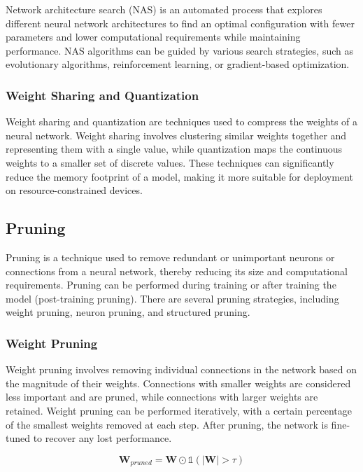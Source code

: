 \documentclass[12pt]{article}
\begin{document}
Network architecture search (NAS) is an automated process that explores different neural network architectures to find an optimal configuration with fewer parameters and lower computational requirements while maintaining performance. NAS algorithms can be guided by various search strategies, such as evolutionary algorithms, reinforcement learning, or gradient-based optimization.

\subsubsection{Weight Sharing and Quantization}

Weight sharing and quantization are techniques used to compress the weights of a neural network. Weight sharing involves clustering similar weights together and representing them with a single value, while quantization maps the continuous weights to a smaller set of discrete values. These techniques can significantly reduce the memory footprint of a model, making it more suitable for deployment on resource-constrained devices.

\subsection{Pruning}

Pruning is a technique used to remove redundant or unimportant neurons or connections from a neural network, thereby reducing its size and computational requirements. Pruning can be performed during training or after training the model (post-training pruning). There are several pruning strategies, including weight pruning, neuron pruning, and structured pruning.

\subsubsection{Weight Pruning}

Weight pruning involves removing individual connections in the network based on the magnitude of their weights. Connections with smaller weights are considered less important and are pruned, while connections with larger weights are retained. Weight pruning can be performed iteratively, with a certain percentage of the smallest weights removed at each step. After pruning, the network is fine-tuned to recover any lost performance.

\begin{equation}
\textbf{W}_{pruned} = \textbf{W} \odot \mathbb{1}(|\textbf{W}| > \tau)
\end{equation}
\end{document}
